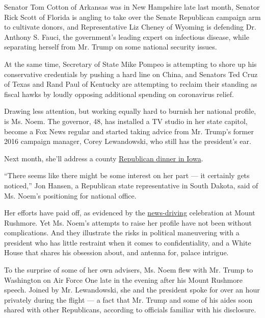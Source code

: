 Senator Tom Cotton of Arkansas was in New Hampshire late last month,
Senator Rick Scott of Florida is angling to take over the Senate
Republican campaign arm to cultivate donors, and Representative Liz
Cheney of Wyoming is defending Dr. Anthony S. Fauci, the government's
leading expert on infectious disease, while separating herself from Mr.
Trump on some national security issues.

At the same time, Secretary of State Mike Pompeo is attempting to shore
up his conservative credentials by pushing a hard line on China, and
Senators Ted Cruz of Texas and Rand Paul of Kentucky are attempting to
reclaim their standing as fiscal hawks by loudly opposing additional
spending on coronavirus relief.

Drawing less attention, but working equally hard to burnish her national
profile, is Ms. Noem. The governor, 48, has installed a TV studio in her
state capitol, become a Fox News regular and started taking advice from
Mr. Trump's former 2016 campaign manager, Corey Lewandowski, who still
has the president's ear.

Next month, she'll address a county
\href{https://nonpareilonline.com/news/local/govt-and-politics/south-dakota-governor-to-headline-pottawattamie-county-gop-dinner/article_4c86d770-2297-5129-8746-2b2e3ccf40a3.html}{Republican
dinner in Iowa}.

``There seems like there might be some interest on her part --- it
certainly gets noticed,'' Jon Hansen, a Republican state representative
in South Dakota, said of Ms. Noem's positioning for national office.

Her efforts have paid off, as evidenced by the
\href{https://www.nytimes.com/2020/07/03/us/politics/trump-coronavirus-mount-rushmore.html}{news-driving}
celebration at Mount Rushmore. Yet Ms. Noem's attempts to raise her
profile have not been without complications. And they illustrate the
risks in political maneuvering with a president who has little restraint
when it comes to confidentiality, and a White House that shares his
obsession about, and antenna for, palace intrigue.

To the surprise of some of her own advisers, Ms. Noem flew with Mr.
Trump to Washington on Air Force One late in the evening after his Mount
Rushmore speech. Joined by Mr. Lewandowski, she and the president spoke
for over an hour privately during the flight --- a fact that Mr. Trump
and some of his aides soon shared with other Republicans, according to
officials familiar with his disclosure.


